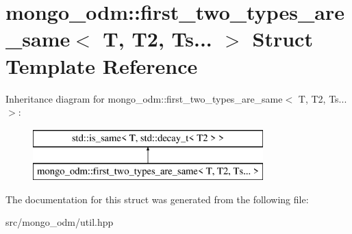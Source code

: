 \hypertarget{structmongo__odm_1_1first__two__types__are__same_3_01T_00_01T2_00_01Ts_8_8_8_01_4}{}\section{mongo\+\_\+odm\+:\+:first\+\_\+two\+\_\+types\+\_\+are\+\_\+same$<$ T, T2, Ts... $>$ Struct Template Reference}
\label{structmongo__odm_1_1first__two__types__are__same_3_01T_00_01T2_00_01Ts_8_8_8_01_4}
Inheritance diagram for mongo\+\_\+odm\+:\+:first\+\_\+two\+\_\+types\+\_\+are\+\_\+same$<$ T, T2, Ts... $>$\+:\begin{figure}[H]
\begin{center}
\leavevmode
\includegraphics[height=2.000000cm]{structmongo__odm_1_1first__two__types__are__same_3_01T_00_01T2_00_01Ts_8_8_8_01_4}
\end{center}
\end{figure}


The documentation for this struct was generated from the following file\+:\begin{DoxyCompactItemize}
\item 
src/mongo\+\_\+odm/util.\+hpp\end{DoxyCompactItemize}
